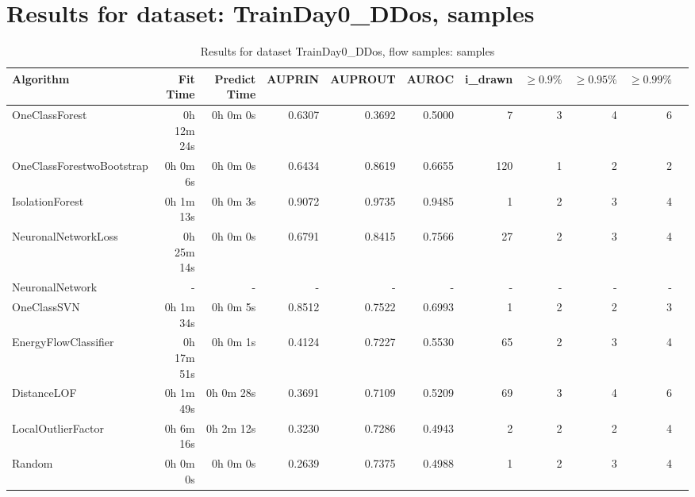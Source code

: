 \documentclass{article}
\begin{document}
\section*{Results for dataset: TrainDay0_DDos, samples}
\begin{table}[h!]
\centering
\caption{Results for dataset TrainDay0_DDos, flow samples: samples}
\begin{tabular}{lrrrrrrrrrr}
\toprule
Algorithm & Fit Time & Predict Time & AUPRIN & AUPROUT & AUROC & i\_drawn & $\geq 0.9\%$ & $\geq 0.95\%$ & $\geq 0.99\%$ \\
\midrule
OneClassForest & 0h 12m 24s & 0h 0m 0s & 0.6307 & 0.3692 & 0.5000 & 7 & 3 & 4 & 6 \\
OneClassForestwoBootstrap & 0h 0m 6s & 0h 0m 0s & 0.6434 & 0.8619 & 0.6655 & 120 & 1 & 2 & 2 \\
IsolationForest & 0h 1m 13s & 0h 0m 3s & 0.9072 & 0.9735 & 0.9485 & 1 & 2 & 3 & 4 \\
NeuronalNetworkLoss & 0h 25m 14s & 0h 0m 0s & 0.6791 & 0.8415 & 0.7566 & 27 & 2 & 3 & 4 \\
NeuronalNetwork & - & - & - & - & - & - & - & - & - \\
OneClassSVN & 0h 1m 34s & 0h 0m 5s & 0.8512 & 0.7522 & 0.6993 & 1 & 2 & 2 & 3 \\
EnergyFlowClassifier & 0h 17m 51s & 0h 0m 1s & 0.4124 & 0.7227 & 0.5530 & 65 & 2 & 3 & 4 \\
DistanceLOF & 0h 1m 49s & 0h 0m 28s & 0.3691 & 0.7109 & 0.5209 & 69 & 3 & 4 & 6 \\
LocalOutlierFactor & 0h 6m 16s & 0h 2m 12s & 0.3230 & 0.7286 & 0.4943 & 2 & 2 & 2 & 4 \\
Random & 0h 0m 0s & 0h 0m 0s & 0.2639 & 0.7375 & 0.4988 & 1 & 2 & 3 & 4 \\
\bottomrule
\end{tabular}
\end{table}
\end{document}
